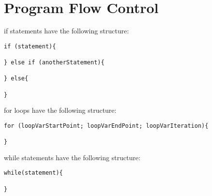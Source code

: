 \documentclass[a4paper,11pt]{article}
\begin{document}
\section{Program Flow Control}
if statements have the following structure:
\begin{verbatim}
if (statement){

} else if (anotherStatement){

} else{

}
\end{verbatim}
for loops have the following structure:
\begin{verbatim}
for (loopVarStartPoint; loopVarEndPoint; loopVarIteration){

}
\end{verbatim}
while statements have the following structure:
\begin{verbatim}
while(statement){

}
\end{verbatim}
\end{document}
